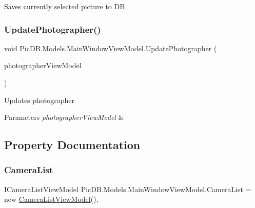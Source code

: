 Saves currently selected picture to DB 

\mbox{\label{class_pic_d_b_1_1_models_1_1_main_window_view_model_a285095e362a804d32af8cc4a5eb55219}} 
\subsubsection{\texorpdfstring{Update\+Photographer()}{UpdatePhotographer()}}
{\footnotesize\ttfamily void Pic\+D\+B.\+Models.\+Main\+Window\+View\+Model.\+Update\+Photographer (\begin{DoxyParamCaption}\item[{\mbox{\hyperlink{class_pic_d_b_1_1_models_1_1_photographer_view_model}{Photographer\+View\+Model}}}]{photographer\+View\+Model }\end{DoxyParamCaption})}



Updates photographer 


\begin{DoxyParams}{Parameters}
{\em photographer\+View\+Model} & \\
\hline
\end{DoxyParams}


\subsection{Property Documentation}
\mbox{\label{class_pic_d_b_1_1_models_1_1_main_window_view_model_a25e33fd3ffcf5e5486a81dbcdd2e6c33}} 
\subsubsection{\texorpdfstring{Camera\+List}{CameraList}}
{\footnotesize\ttfamily I\+Camera\+List\+View\+Model Pic\+D\+B.\+Models.\+Main\+Window\+View\+Model.\+Camera\+List = new \mbox{\hyperlink{class_pic_d_b_1_1_view_models_1_1_camera_list_view_model}{Camera\+List\+View\+Model}}()\hspace{0.3cm}{\ttfamily [get]}, {\ttfamily [set]}}



